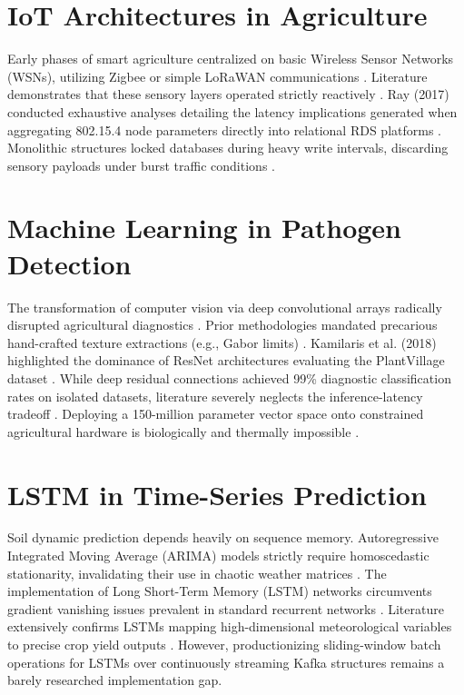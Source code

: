 \documentclass[12pt, a4paper]{report}
\begin{document}
\section{IoT Architectures in Agriculture}
Early phases of smart agriculture centralized on basic Wireless Sensor Networks (WSNs), utilizing Zigbee or simple LoRaWAN communications \cite{r20}. Literature demonstrates that these sensory layers operated strictly reactively \cite{r21}. Ray (2017) conducted exhaustive analyses detailing the latency implications generated when aggregating 802.15.4 node parameters directly into relational RDS platforms \cite{r22}. Monolithic structures locked databases during heavy write intervals, discarding sensory payloads under burst traffic conditions \cite{r23}.

\section{Machine Learning in Pathogen Detection}
The transformation of computer vision via deep convolutional arrays radically disrupted agricultural diagnostics \cite{r24}. Prior methodologies mandated precarious hand-crafted texture extractions (e.g., Gabor limits) \cite{r25}. Kamilaris et al. (2018) highlighted the dominance of ResNet architectures evaluating the PlantVillage dataset \cite{r26}. While deep residual connections achieved 99\% diagnostic classification rates on isolated datasets, literature severely neglects the inference-latency tradeoff \cite{r27}. Deploying a 150-million parameter vector space onto constrained agricultural hardware is biologically and thermally impossible \cite{r28}.

\section{LSTM in Time-Series Prediction}
Soil dynamic prediction depends heavily on sequence memory. Autoregressive Integrated Moving Average (ARIMA) models strictly require homoscedastic stationarity, invalidating their use in chaotic weather matrices \cite{r29}. The implementation of Long Short-Term Memory (LSTM) networks circumvents gradient vanishing issues prevalent in standard recurrent networks \cite{r30}. Literature extensively confirms LSTMs mapping high-dimensional meteorological variables to precise crop yield outputs \cite{r1}. However, productionizing sliding-window batch operations for LSTMs over continuously streaming Kafka structures remains a barely researched implementation gap.
\end{document}
